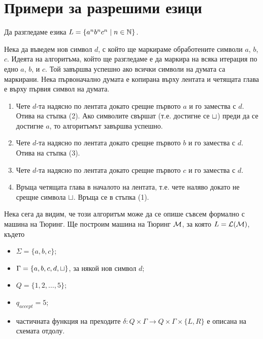 

\section{Примери за разрешими езици}

\begin{example}
  Да разгледаме езика $L = \{a^nb^nc^n \mid n\in\mathbb{N}\}$.
 
  Нека да въведем нов символ $d$, с който ще маркираме обработените символи $a$, $b$, $c$.
  Идеята на алгоритъма, който ще разгледаме е да маркира на всяка итерация по едно $a$, $b$, и $c$.
  Той завършва успешно ако всички символи на думата са маркирани.
  Нека първоначално думата е копирана върху лентата и четящата глава е върху първия символ на думата.
  \begin{enumerate}[(1)]
  \item 
    Чете $d$-та надясно по лентата докато срещне първото $a$ и го замества с $d$. Отива на стъпка (2).
    Ако символите свършат (т.е. достигне се $\sqcup$) преди да се достигне $a$,
    то алгоритъмът завършва успешно.
  \item
    Чете $d$-та надясно по лентата докато срещне първото $b$ и го замества с $d$.
    Отива на стъпка (3).
  \item
    Чете $d$-та надясно по лентата докато срещне първото $c$ и го замества с $d$.
  \item
    Връща четящата глава в началото на лентата, т.е. чете наляво докато не срещне символа $\sqcup$.
    Връща се в стъпка (1). 
  \end{enumerate}

  Нека сега да видим, че този алгоритъм може да се опише съвсем формално с машина на Тюринг.
  Ще построим машина на Тюринг $\mathcal{M}$, за която $L = \mathcal{L}(\mathcal{M})$, където
  \begin{itemize}
  \item 
    $\Sigma = \{a,b,c\}$;
  \item
    $\Gamma = \{a,b,c,d,\sqcup\}$, за някой нов символ $d$;
  \item
    $Q = \{1,2,\dots,5\}$;
  \item
    $q_{accept} = 5$;
  \item
    частичната функция на преходите $\delta:Q\times\Gamma \to Q\times\Gamma\times\{L,R\}$
    е описана на схемата отдолу.
  \end{itemize}


\end{example}
